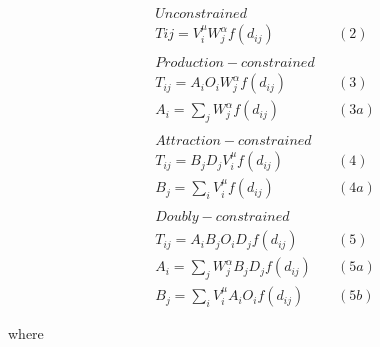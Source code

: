 \documentclass[11pt]{article}
\begin{document}
\[
\begin{align}
&Unconstrained \  \\
&Tij = V_{i}^\mu W_{j}^\alpha  f(d_{ij}) \quad & (2) \\
\\
&Production-constrained \\
&T_{ij} = A_{i}O_{i}W_{j}^\alpha f(d_{ij}) \quad & (3) \\
&A_{i} = \sum_{j} W_{j}^\alpha f(d_{ij}) \quad & (3a) \\
\\
&Attraction-constrained \\
&T_{ij} = B_{j}D_{j}V_{i}^\mu f(d_{ij}) \quad & (4) \\
&B_{j} = \sum_{i} V_{i}^\mu f(d_{ij}) \quad & (4a) \\
\\
&Doubly-constrained \\
&T_{ij} = A_{i}B_{j}O_{i}D_{j}f(d_{ij}) \quad & (5) \\
&A_{i} = \sum_{j} W_{j}^\alpha B_{j} D_{j} f(d_{ij}) \quad & (5a) \\
&B_{j} = \sum_{i} V_{i}^\mu A_{i} O_{i} f(d_{ij}) \quad & (5b)
\end{align}
\]

where
\end{document}
